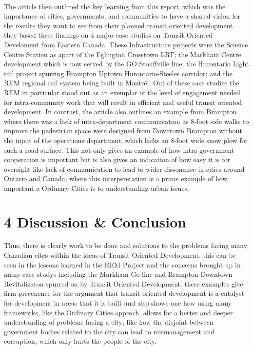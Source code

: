 \documentclass[12pt]{book}
\begin{document}
\paragraph*{}
The article then outlined the key learning from this report, which was the importance of cities, governments, and communities 
to have a shared vision for the results they want to see from their planned transit oriented development. they based these findings
on 4 major case studies on Transit Oriented Develoment from Eastern Canada. These Infrastructure projects were the Science Centre Station 
as apart of the Eglington Crosstown LRT; the Markham Centre development which is now served by the GO Stouffville line; the Hurontario
Light rail project spurring Brampton Uptown Hurontario-Steeles corridor; and the REM regional rail system being built in Montr\'el.\cite{report}
Out of these case studies the REM in particular stood out as an exemplar of the level of engagement needed for intra-community work that
will result in efficient and useful transit oriented development. In contrast, the article also outlines an example from Brampton where 
there was a lack of intra-department communication as 8-foot side walks to improve the pedestrian space were designed from Downtown Brampton
without the input of the operations department, which lacks an 8-foot wide snow plow for such a road surface.\cite{article} 
This not only gives an example of how intra-government cooperation is important but is also gives an indication of how easy it is for oversight like 
lack of communication to lead to wider dissonance in cities around Ontario and Canada; where this interperetation is a prime example of how 
important a Ordinary Cities is to understanding urban issues.


\section*{4 Discussion \& Conclusion} %
\paragraph*{}
Thus, there is clearly work to be done and solutions to the problems facing many Canadian cites within the ideas of Transit Oriented Development.
this can be seen in the lessons learned in the REM Project and the concerns brought up in many case studys including the Markham Go line and
Brampton Downtown Revitalizaton spurred on by Transit Oriented Development. these examples give firm precenence for the argument that transit oriented
development is a catalyst for development in areas that it is built and also shows one how using many frameworks, like the Ordinary Cities approch, 
allows for a better and deeper understanding of problems facing a city; like how the disjoint between government bodies related to the city can lead
to mismanagement and corruption, which only hurts the people of the city.\cite{article}
\end{document}
